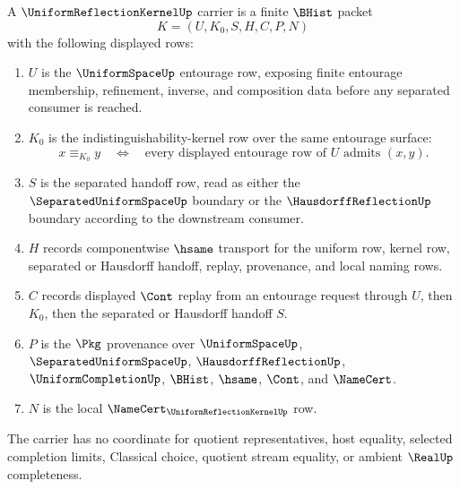 \begin{definition}
\label{def:uniform-reflection-kernel}
A $\UniformReflectionKernelUp$ carrier is a finite $\BHist$ packet
$$
K=(U,K_0,S,H,C,P,N)
$$
with the following displayed rows:
\begin{enumerate}
\item $U$ is the $\UniformSpaceUp$ entourage row, exposing finite entourage membership, refinement, inverse, and composition data before any separated consumer is reached.
\item $K_0$ is the indistinguishability-kernel row over the same entourage surface:
$$
x \equiv_{K_0} y
\quad\Longleftrightarrow\quad
\text{every displayed entourage row of }U\text{ admits }(x,y).
$$
\item $S$ is the separated handoff row, read as either the $\SeparatedUniformSpaceUp$ boundary or the $\HausdorffReflectionUp$ boundary according to the downstream consumer.
\item $H$ records componentwise $\hsame$ transport for the uniform row, kernel row, separated or Hausdorff handoff, replay, provenance, and local naming rows.
\item $C$ records displayed $\Cont$ replay from an entourage request through $U$, then $K_0$, then the separated or Hausdorff handoff $S$.
\item $P$ is the $\Pkg$ provenance over $\UniformSpaceUp$, $\SeparatedUniformSpaceUp$, $\HausdorffReflectionUp$, $\UniformCompletionUp$, $\BHist$, $\hsame$, $\Cont$, and $\NameCert$.
\item $N$ is the local $\NameCert_{\UniformReflectionKernelUp}$ row.
\end{enumerate}
The carrier has no coordinate for quotient representatives, host equality, selected completion limits, Classical choice, quotient stream equality, or ambient $\RealUp$ completeness.
\end{definition}

